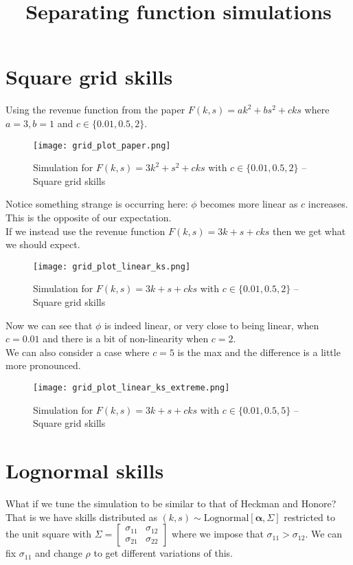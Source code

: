 \documentclass{article}
\title{Separating function simulations}
\author{}
\date{}
\begin{document}
	
\section{Square grid skills}

Using the revenue function from the paper $F(k,s) = ak^2 + bs^2 + cks$ where $a=3,b=1$ and $c \in \{0.01,0.5,2\}$.

	\begin{figure}[H]
	\centering
	\texttt{[image: grid\_plot\_paper.png]}
	\caption{Simulation for $F(k,s) = 3k^2 + s^2 + cks$ with $c\in\{0.01,0.5,2\}$ -- Square grid skills}
\end{figure}

Notice something strange is occurring here: $\phi$ becomes more linear as $c$ increases. This is the opposite of our expectation.\\

If we instead use the revenue function $F(k,s) = 3k + s + cks$ then we get what we should expect.

	\begin{figure}[H]
	\centering
	\texttt{[image: grid\_plot\_linear\_ks.png]}
	\caption{Simulation for $F(k,s) = 3k + s + cks$ with $c\in\{0.01,0.5,2\}$ -- Square grid skills}
\end{figure}

Now we can see that $\phi$ is indeed linear, or very close to being linear, when $c=0.01$ and there is a bit of non-linearity when $c=2$.\\

We can also consider a case where $c=5$ is the max and the difference is a little more pronounced.

	\begin{figure}[H]
	\centering
	\texttt{[image: grid\_plot\_linear\_ks\_extreme.png]}
	\caption{Simulation for $F(k,s) = 3k + s + cks$ with $c\in\{0.01,0.5,5\}$ -- Square grid skills}
\end{figure}

\section{Lognormal skills}
What if we tune the simulation to be similar to that of Heckman and Honore? That is we have skills distributed as $(k,s) \sim \text{Lognormal}[\mathbf{\alpha},\Sigma]$ restricted to the unit square with $\Sigma = \begin{bmatrix}
	\sigma_{11} & \sigma_{12} \\
	\sigma_{21} & \sigma_{22}
\end{bmatrix}$ where we impose that $\sigma_{11} > \sigma_{12}$. We can fix $\sigma_{11}$ and change $\rho$ to get different variations of this.
\end{document}
